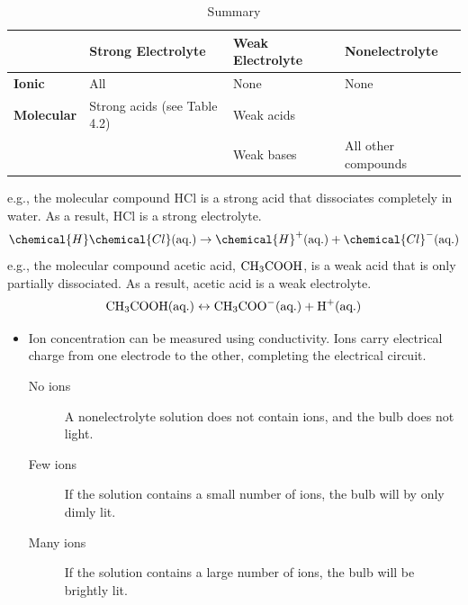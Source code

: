 \documentclass[
	chapter=4
]{chem122notes}
\begin{document}
\begin{table}[H]
	\centering
	\caption{Summary}
	\label{tab:electrolyte-bonds}
	\begin{tabular}{l l l l}
		& \textbf{Strong Electrolyte} & \textbf{Weak Electrolyte} & \textbf{Nonelectrolyte}\\
		\hline
		\textbf{Ionic} & All & None & None\\
		\textbf{Molecular} & Strong acids (see Table 4.2) & Weak acids & \\
		& & Weak bases & All other compounds\\
		\hline
	\end{tabular}
\end{table}
e.g., the molecular compound HCl is a strong acid that dissociates completely in water.
As a result, HCl is a strong electrolyte.
\[ \chemical{H}\chemical{Cl} (\mbox{aq.}) \rightarrow \chemical{H}^{+} (\mbox{aq.}) + \chemical{Cl}^{-} (\mbox{aq.}) \]
e.g., the molecular compound acetic acid, $\element{C}\element{H}[3]\element{C}\element{O}\element{O}\element{H}$, is a weak acid that is only partially dissociated.
As a result, acetic acid is a weak electrolyte.
\[ \element{C}\element{H}[3]\element{C}\element{O}\element{O}\element{H} (\mbox{aq.}) \leftrightarrow \element{C}\element{H}[3]\element{C}\element{O}\element{O}^{-} (\mbox{aq.}) + \element{H}^{+} (\mbox{aq.}) \]

\begin{itemize}
	\item Ion concentration can be measured using conductivity.
	Ions carry electrical charge from one electrode to the other, completing the electrical circuit.
	\begin{description}
		\item[No ions] A nonelectrolyte solution does not contain ions, and the bulb does not light.
		\item[Few ions] If the solution contains a small number of ions, the bulb will by only dimly lit.
		\item[Many ions] If the solution contains a large number of ions, the bulb will be brightly lit.
	\end{description}
\end{itemize}
\end{document}

